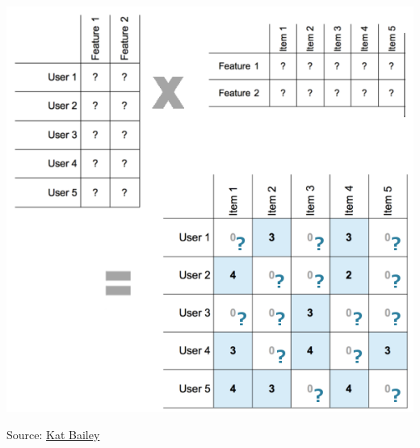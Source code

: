 \documentclass[11pt,aspectratio=169]{beamer}
\begin{document}
\begin{frame}
\begin{columns}
\begin{column}{0.4\textwidth}
\begin{center}
					\includegraphics[width=\textwidth]{images/matrix_factorization.png}
					
					{\tiny Source: \href{https://katbailey.github.io/post/matrix-factorization-with-tensorflow/}{\color{blue} Kat Bailey}}
				\end{center}
			\end{column}
		\end{columns}
	\end{frame}
\end{document}
